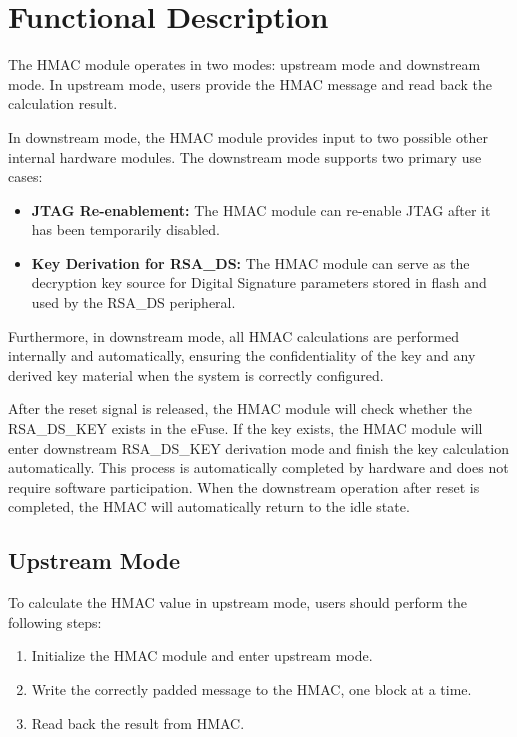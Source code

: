 \documentclass[main\_\_EN.tex]{subfiles}
\begin{document}
\section{Functional Description}

The HMAC module operates in two modes: upstream mode and downstream mode. In upstream mode, users provide the HMAC message and read back the calculation result.

In downstream mode, the HMAC module provides input to two possible other internal hardware modules. The downstream mode supports two primary use cases:

\begin{itemize}
\item \textbf{JTAG Re-enablement:} The HMAC module can re-enable JTAG after it has been temporarily disabled.
\item \textbf{Key Derivation for RSA\_DS:} The HMAC module can serve as the decryption key source for Digital Signature parameters stored in flash and used by the RSA\_DS peripheral.
\end{itemize}

Furthermore, in downstream mode, all HMAC calculations are performed internally and automatically, ensuring the confidentiality of the key and any derived key material when the system is correctly configured.

\begin{tiplisting}
After the reset signal is released, the HMAC module will check whether the RSA\_DS\_KEY exists in the eFuse. If the key exists, the HMAC module will enter downstream RSA\_DS\_KEY derivation mode and finish the key calculation automatically. This process is automatically completed by hardware and does not require software participation. When the downstream operation after reset is completed, the HMAC will automatically return to the idle state.
\end{tiplisting}

\subsection{Upstream Mode}

To calculate the HMAC value in upstream mode, users should perform the following steps:

\begin{enumerate}
    \item Initialize the HMAC module and enter upstream mode.
    \item Write the correctly padded message to the HMAC, one block at a time.
    \item Read back the result from HMAC.
\end{enumerate}
\end{document}
